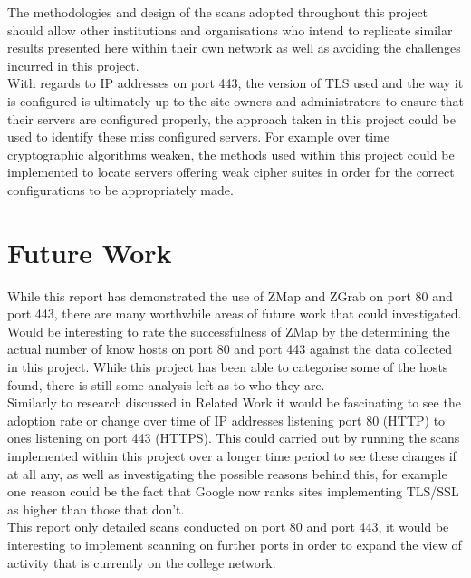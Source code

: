 \documentclass[a4wide,leqno,12pt]{report}
\begin{document}
The methodologies and design of the scans adopted throughout this project should allow other institutions and organisations who intend to replicate similar results presented here within their own network as well as avoiding the challenges incurred in this project.\\

With regards to IP addresses on port 443, the version of TLS used and the way it is configured is ultimately up to the site owners and administrators to ensure that their servers are configured properly, the approach taken in this project could be used to identify these miss configured servers. For example over time cryptographic algorithms weaken, the methods used within this project could be implemented to locate servers offering weak cipher suites in order for the correct configurations to be appropriately made. 

\chapter{Future Work}
While this report has demonstrated the use of ZMap and ZGrab on port 80 and port 443, there are many worthwhile areas of future work that could investigated.\\

Would be interesting to rate the successfulness of ZMap by the determining the actual number of know hosts on port 80 and port 443 against the data collected in this project. While this project has been able to categorise some of the hosts found, there is still some analysis left as to who they are.\\

Similarly to research discussed in Related Work \cite{durumeric2013zmap} \cite{durumeric2013analysis} it would be fascinating to see the adoption rate or change over time of IP addresses listening port 80 (HTTP) to ones listening on port 443 (HTTPS). This could carried out by running the scans implemented within this project over a longer time period to see these changes if at all any, as well as investigating the possible reasons behind this, for example one reason could be the fact that Google now ranks sites implementing TLS/SSL as higher than those that don't.\\

This report only detailed scans conducted on port 80 and port 443, it would be interesting to implement scanning on further ports in order to expand the view of activity that is currently on the college network.\\
\end{document}
